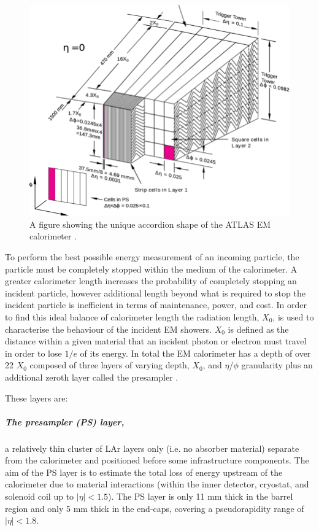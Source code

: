 \documentclass[12pt,a4paper,epsf,portrait,times,epsfig]{report}
\begin{document}
		\begin{figure}
			\centering
			\includegraphics[scale=0.4]{ATLAS_EMCal_Accordion}
			\caption{A figure showing the unique accordion shape of the ATLAS EM calorimeter \cite{ATLASECalAccordionImage}.}
			\label{Fig:ATLASECalAccordion}
		\end{figure}

		To perform the best possible energy measurement of an incoming particle, the particle must be completely stopped within the medium of the calorimeter. A greater calorimeter length increases the probability of completely stopping an incident particle, however additional length beyond what is required to stop the incident particle is inefficient in terms of maintenance, power, and cost. In order to find this ideal balance of calorimeter length the radiation length, $X_{0}$, is used to characterise the behaviour of the incident EM showers. $X_{0}$ is defined as the distance within a given material that an incident photon or electron must travel in order to lose $1/e$ of its energy.  In total the EM calorimeter has a depth of over 22 $X_{0}$ composed of three layers of varying depth, $X_{0}$, and $\eta$/$\phi$ granularity plus an additional zeroth layer called the presampler \cite{ATLASECalAccordionImage}. \par


		These layers are:

		\subparagraph{The presampler (PS) layer,} a relatively thin cluster of LAr layers only (i.e. no absorber material) separate from the calorimeter and positioned before some infrastructure components. The aim of the PS layer is to estimate the total loss of energy upstream of the calorimeter due to material interactions (within the inner detector, cryostat, and solenoid coil up to $|\eta| < 1.5$). The PS layer is only 11 mm thick in the barrel region and only 5 mm thick in the end-caps, covering a pseudorapidity range of $|\eta| < 1.8$.
		
\end{document}
